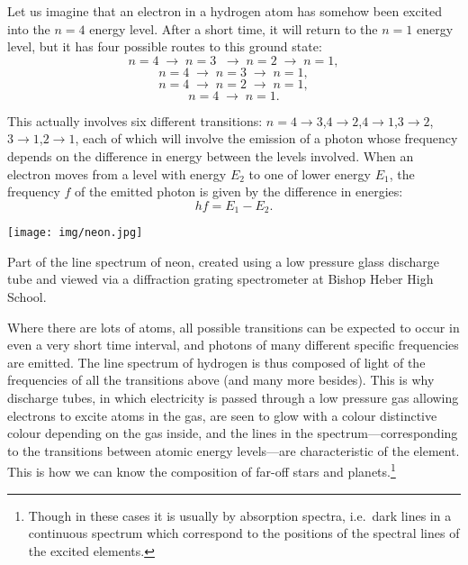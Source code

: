 \label{photon-emission}

Let us imagine that an electron in a hydrogen atom has somehow been excited into the $n=4$ energy level.  After a short time, it will return to the $n=1$ energy level, but it has four possible routes to this ground state:
\[n=4 \;\longrightarrow\; n=3 \; \;\longrightarrow\; n=2 \;\longrightarrow\; n=1,\]
\[n=4 \;\longrightarrow\; n=3 \;\longrightarrow\; n=1,\]
\[n=4 \;\longrightarrow\; n=2 \;\longrightarrow\; n=1,\]
\[n=4 \;\longrightarrow\; n=1.\]

This actually involves six different transitions: $n=4\rightarrow3$,$4\rightarrow2$,$4\rightarrow1$,$3\rightarrow2$,$3\rightarrow1$,$2\rightarrow1$, each of which will involve the emission of a photon whose frequency depends on the difference in energy between the levels involved.  When an electron moves from a level with energy $E_{2}$ to one of lower energy $E_{1}$, the frequency $f$ of the emitted photon is given by the difference in energies:
\[hf=E_{1}-E_{2}.\]

\begin{marginfigure}
\texttt{[image: img/neon.jpg]}
\caption{Part of the line spectrum of neon, created using a low pressure glass discharge tube and viewed via a diffraction grating spectrometer at Bishop Heber High School.}
\end{marginfigure}

Where there are lots of atoms, all possible transitions can be expected to occur in even a very short time interval, and photons of many different specific frequencies are emitted.  The line spectrum of hydrogen is thus composed of light of the frequencies of all the transitions above (and many more besides).  This is why discharge tubes, in which electricity is passed through a low pressure gas allowing electrons to excite atoms in the gas, are seen to glow with a colour distinctive colour depending on the gas inside, and the lines in the spectrum---corresponding to the transitions between atomic energy levels---are characteristic of the element.  This is how we can know the composition of far-off stars and planets.\footnote{Though in these cases it is usually by absorption spectra, i.e.\ dark lines in a continuous spectrum which correspond to the positions of the spectral lines of the excited elements.}
